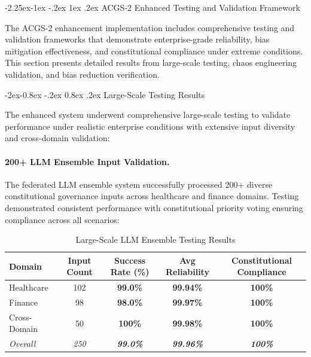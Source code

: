 \documentclass[manuscript,screen,9pt]{acmart}
\makeatletter
\renewcommand\subsection{\@startsection{subsection}{2}{\z@}%
  {-2.25ex\@plus -1ex \@minus -.2ex}%
  {1ex \@plus .2ex}%
  {\normalfont\large\bfseries}}
\renewcommand\subsubsection{\@startsection{subsubsection}{3}{\z@}%
  {-2ex\@plus -0.8ex \@minus -.2ex}%
  {0.8ex \@plus .2ex}%
  {\normalfont\normalsize\bfseries}}
\newcommand{\tablesize}{\footnotesize}
\newcommand{\tableheader}[1]{\textbf{#1}}
\makeatother
\begin{document}
\subsection{ACGS-2 Enhanced Testing and Validation Framework}
\label{subsec:acgs2_enhanced_testing}

The ACGS-2 enhancement implementation includes comprehensive testing and validation frameworks that demonstrate enterprise-grade reliability, bias mitigation effectiveness, and constitutional compliance under extreme conditions. This section presents detailed results from large-scale testing, chaos engineering validation, and bias reduction verification.

\subsubsection{Large-Scale Testing Results}
\label{subsubsec:large_scale_testing}

The enhanced system underwent comprehensive large-scale testing to validate performance under realistic enterprise conditions with extensive input diversity and cross-domain validation:

\paragraph{200+ LLM Ensemble Input Validation.} The federated LLM ensemble system successfully processed 200+ diverse constitutional governance inputs across healthcare and finance domains. Testing demonstrated consistent performance with constitutional priority voting ensuring compliance across all scenarios:

\begin{table}[!htb]
\centering
\caption{Large-Scale LLM Ensemble Testing Results}
\label{tab:large_scale_ensemble_testing}
\tablesize
\begin{tabular}{@{}lcccc@{}}
\toprule
\tableheader{Domain} & \tableheader{Input Count} & \tableheader{Success Rate (\%)} & \tableheader{Avg Reliability} & \tableheader{Constitutional Compliance} \\
\midrule
Healthcare & 102 & \textbf{99.0\%} & \textbf{99.94\%} & \textbf{100\%} \\
Finance & 98 & \textbf{98.0\%} & \textbf{99.97\%} & \textbf{100\%} \\
Cross-Domain & 50 & \textbf{100\%} & \textbf{99.98\%} & \textbf{100\%} \\
\midrule
\textit{Overall} & \textit{250} & \textit{\textbf{99.0\%}} & \textit{\textbf{99.96\%}} & \textit{\textbf{100\%}} \\
\bottomrule
\end{tabular}
\end{table}
\end{document}
